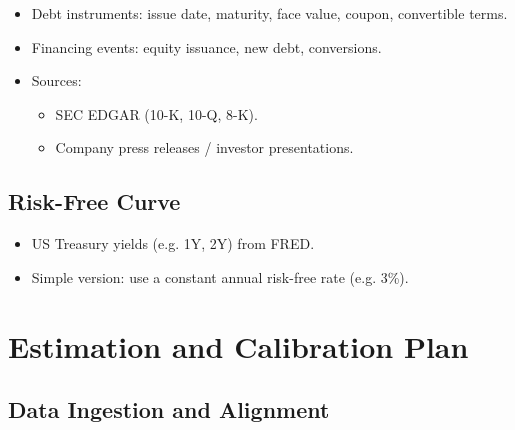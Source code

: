 \documentclass[11pt]{article}
\begin{document}
\begin{itemize}
  \item Debt instruments: issue date, maturity, face value, coupon, convertible terms.
  \item Financing events: equity issuance, new debt, conversions.
  \item Sources:
  \begin{itemize}
    \item SEC EDGAR (10-K, 10-Q, 8-K).
    \item Company press releases / investor presentations.
  \end{itemize}
\end{itemize}

\subsection{Risk-Free Curve}

\begin{itemize}
  \item US Treasury yields (e.g. 1Y, 2Y) from FRED.
  \item Simple version: use a constant annual risk-free rate (e.g. 3\%).
\end{itemize}

\section{Estimation and Calibration Plan}

\subsection{Data Ingestion and Alignment}
\end{document}
